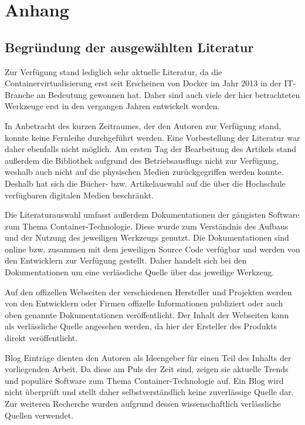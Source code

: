 \section{Anhang}
\label{sec:anhang}
\subsection{Begründung der ausgewählten Literatur}
\label{app:BegruendungLiteratur}
Zur Verfügung stand lediglich sehr aktuelle Literatur, da die Containervirtualisierung erst seit Erscheinen von Docker im Jahr 2013 in der IT-Branche an Bedeutung gewonnen hat. Daher sind auch viele der hier betrachteten Werkzeuge erst in den vergangen Jahren entwickelt worden.

In  Anbetracht des kurzen Zeitraumes, der den Autoren zur Verfügung stand, konnte keine Fernleihe durchgeführt werden.
Eine Vorbestellung der Literatur war daher ebenfalls nicht möglich.
Am ersten Tag der Bearbeitung des Artikels stand außerdem die Bibliothek aufgrund des Betriebsausflugs nicht zur Verfügung, weshalb auch nicht auf die physischen Medien zurückgegriffen werden konnte.
Deshalb hat sich die Bücher- bzw. Artikelauswahl auf die über die Hochschule verfügbaren digitalen Medien beschränkt.

Die  Literaturauswahl umfasst außerdem Dokumentationen der gängisten Software zum Thema Container-Technologie.
Diese wurde zum Verständnis des Aufbaus und der Nutzung des jeweiligen Werkzeugs genutzt. 
Die Dokumentationen sind online bzw. zusammen mit dem jeweiligen Source Code verfügbar und werden von den Entwicklern zur  Verfügung gestellt. 
Daher handelt sich bei den Dokumentationen um eine verlässliche Quelle über das jeweilige Werkzeug.


Auf den offizellen Webseiten der verschiedenen Hersteller und Projekten werden von den Entwicklern oder Firmen offizelle Informationen publiziert oder auch oben genannte Dokumentationen veröffentlicht. Der Inhalt der Webseiten kann als verlässliche Quelle angesehen werden, da hier der Ersteller des Produkts direkt veröffentlicht.


Blog Einträge dienten den Autoren als Ideengeber für einen Teil des Inhalts der vorliegenden Arbeit.
Da diese am Puls der Zeit sind, zeigen sie aktuelle Trends und populäre Software zum Thema Container-Technologie auf.
Ein Blog wird nicht überprüft und stellt daher selbstverständlich keine zuverlässige Quelle dar.
Zur weiteren Recherche wurden aufgrund dessen wissenschaftlich verlässliche Quellen verwendet.